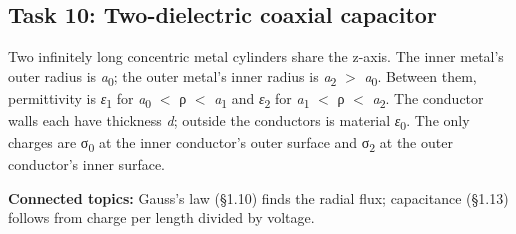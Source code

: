 \documentclass[11pt]{article}
\begin{document}
\begin{keepsection}
\section{Task 10: Two-dielectric coaxial capacitor}

Two infinitely long concentric metal cylinders share the z-axis. The inner metal’s outer radius is \textit{a}\textsubscript{0}; the outer metal’s inner radius is \textit{a}\textsubscript{2} \ensuremath{>} \textit{a}\textsubscript{0}. Between them, permittivity is \textit{ε}\textsubscript{1} for \textit{a}\textsubscript{0} \ensuremath{<} ρ \ensuremath{<} \textit{a}\textsubscript{1} and \textit{ε}\textsubscript{2} for \textit{a}\textsubscript{1} \ensuremath{<} ρ \ensuremath{<} \textit{a}\textsubscript{2}. The conductor walls each have thickness \textit{d}; outside the conductors is material \textit{ε}\textsubscript{0}. The only charges are σ\textsubscript{0} at the inner conductor’s outer surface and σ\textsubscript{2} at the outer conductor’s inner surface.

\textbf{Connected topics:} Gauss’s law (§1.10) finds the radial flux; capacitance (§1.13) follows from charge per length divided by voltage.


\end{keepsection}
\end{document}
